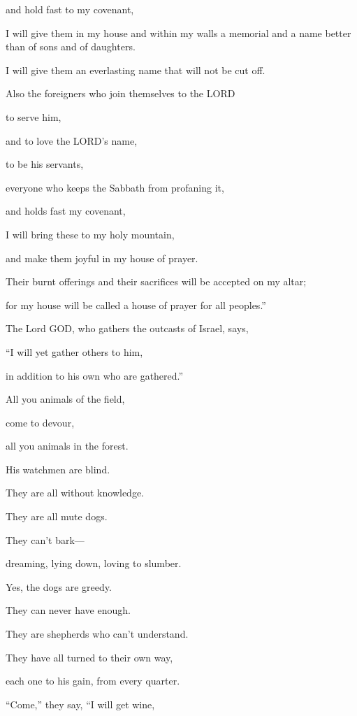 and hold fast to my covenant,

\myverse{}I will give them in my house and within my walls a memorial and
a name better than of sons and of daughters.

I will give them an everlasting name that will not be cut off.


\vspace{\baselineskip} \myverse{}Also the foreigners who join themselves to the LORD

to serve him,

and to love the LORD’s name,

to be his servants,

everyone who keeps the Sabbath from profaning it,

and holds fast my covenant,

\myverse{}I will bring these to my holy mountain,

and make them joyful in my house of prayer.

Their burnt offerings and their sacrifices will be accepted on my altar;

for my house will be called a house of prayer for all peoples.”

\myverse{}The Lord GOD, who gathers the outcasts of Israel, says,

“I will yet gather others to him,

in addition to his own who are gathered.”


\vspace{\baselineskip} \myverse{}All you animals of the field,

come to devour,

all you animals in the forest.

\myverse{}His watchmen are blind.

They are all without knowledge.

They are all mute dogs.

They can’t bark—

dreaming, lying down, loving to slumber.

\myverse{}Yes, the dogs are greedy.

They can never have enough.

They are shepherds who can’t understand.

They have all turned to their own way,

each one to his gain, from every quarter.

\myverse{}“Come,” they say, “I will get wine,

